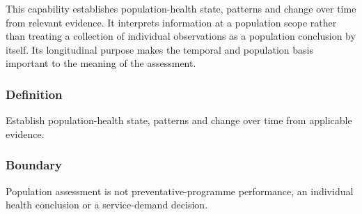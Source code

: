 This capability establishes population-health state, patterns and change over time from relevant evidence. It interprets information at a population scope rather than treating a collection of individual observations as a population conclusion by itself. Its longitudinal purpose makes the temporal and population basis important to the meaning of the assessment.

\subsubsection*{Definition}

Establish population-health state, patterns and change over time from applicable evidence.

\subsubsection*{Boundary}

Population assessment is not preventative-programme performance, an individual health conclusion or a service-demand decision.

